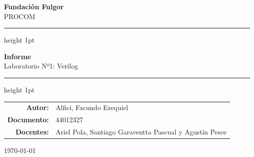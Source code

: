 \documentclass[12pt, a4paper]{article}
\newcommand{\tema}{Laboratorio Nº1: Verilog}
\newcommand{\titulotrabajo}{Informe}
\newcommand{\autor}{Alfici, Facundo Ezequiel}
\newcommand{\documento}{44012327}
\newcommand{\curso}{PROCOM}
\newcommand{\fundacion}{Fundación Fulgor}
\newcommand{\fecha}{\today}
\begin{document}
\thispagestyle{empty}

\begin{center}   %

    {\Large \textbf{\fundacion}}\\[0.3cm]      %
    {\large \curso}

    \vspace{1.5cm}   %


    \hrule height 1pt   %
    \vspace{0.4cm}

    {\LARGE \textbf{\titulotrabajo}}\\[0.3cm]
    {\large \tema}

    \vspace{0.4cm}
    \hrule height 1pt

    \vspace{2.5cm}

    \begin{tabular}{r l}   %
        \textbf{Autor:}   & \autor\\[0.2cm]
        \textbf{Documento:}  & \documento\\[0.2cm]
        \textbf{Docentes:} &  Ariel Pola, Santiago Garaventta Pascual y Agustín Pesce\\
    \end{tabular}

    \vspace{3cm}

    {\large \fecha}

\end{center}

\newpage

\tableofcontents   %
\newpage
\end{document}
